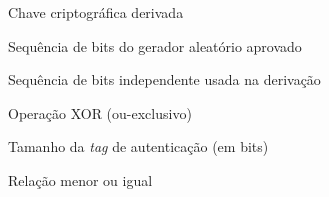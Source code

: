 \documentclass[
	12pt,				%
	openright,			%
	twoside,			%
	a4paper,			%
	english,			%
	brazilian				%
	]{abntex2}
\begin{document}
\begin{simbolos}
  \item[$K$] Chave criptográfica derivada
  \item[$U$] Sequência de bits do gerador aleatório aprovado
  \item[$V$] Sequência de bits independente usada na derivação
  \item[$\oplus$] Operação XOR (ou-exclusivo)
  \item[$\lambda$] Tamanho da \textit{tag} de autenticação (em bits)
  \item[$\leq$] Relação menor ou igual
\end{simbolos}

\tableofcontents*
\cleardoublepage


\hypersetup{pageanchor=true}
\textual













% 
% 


% 

\postextual
\end{document}
